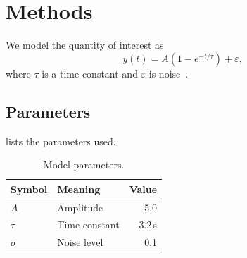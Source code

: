 \chapter{Methods}
\label{ch:methods}

We model the quantity of interest as
\begin{equation}
  y(t) = A\left(1 - e^{-t/\tau}\right) + \varepsilon,
  \label{eq:model}
\end{equation}
where $\tau$ is a time constant and $\varepsilon$ is noise~\cite{mittelbach2004}.

\section{Parameters}
 lists the parameters used.

\begin{table}[htbp]
  \centering
  \caption{Model parameters.}
  \label{tab:params}
  \begin{tabular}{llr}
    \toprule
    Symbol & Meaning & Value \\
    \midrule
    $A$    & Amplitude       & 5.0 \\
    $\tau$ & Time constant   & 3.2\,s \\
    $\sigma$ & Noise level   & 0.1 \\
    \bottomrule
  \end{tabular}
\end{table}
